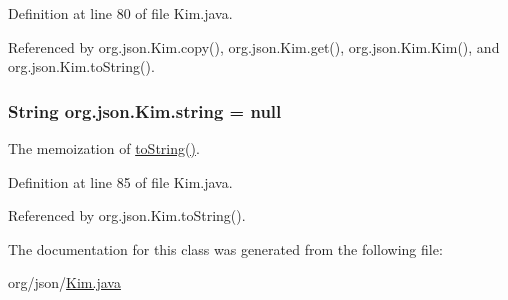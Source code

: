 Definition at line 80 of file Kim.\-java.



Referenced by org.\-json.\-Kim.\-copy(), org.\-json.\-Kim.\-get(), org.\-json.\-Kim.\-Kim(), and org.\-json.\-Kim.\-to\-String().

\hypertarget{classorg_1_1json_1_1_kim_ab3c21a745d0601eb36105ec3769a310a}{
\subsubsection[{string}]{\setlength{\rightskip}{0pt plus 5cm}String org.\-json.\-Kim.\-string = null\hspace{0.3cm}{\ttfamily [private]}}}\label{classorg_1_1json_1_1_kim_ab3c21a745d0601eb36105ec3769a310a}
The memoization of \hyperlink{classorg_1_1json_1_1_kim_aebfdbe281cc48dd341c1a24e389d5b89}{to\-String()}. 

Definition at line 85 of file Kim.\-java.



Referenced by org.\-json.\-Kim.\-to\-String().



The documentation for this class was generated from the following file\-:\begin{DoxyCompactItemize}
\item 
org/json/\hyperlink{_kim_8java}{Kim.\-java}\end{DoxyCompactItemize}
